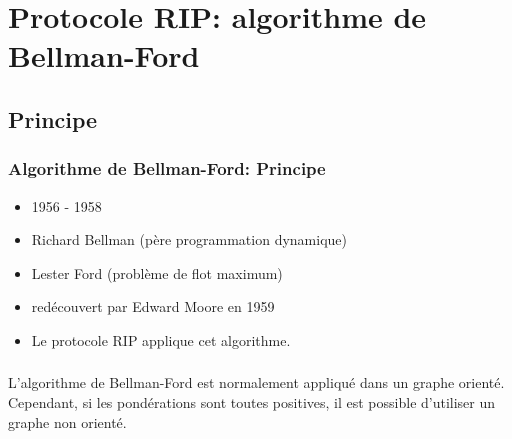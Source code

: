 \documentclass[svgnames,11pt]{beamer}
\begin{document}
\section{Protocole RIP: algorithme de Bellman-Ford}
\subsection{Principe}
\begin{frame}
    \frametitle{Algorithme de Bellman-Ford: Principe}

    \begin{itemize}
        \item<1-> 1956 - 1958
        \item<2-> Richard Bellman (père programmation dynamique)
        \item<3-> Lester Ford (problème de flot maximum)
        \item<4-> redécouvert par Edward Moore en 1959
        \item<5-> Le protocole RIP applique cet algorithme.
    \end{itemize}
\end{frame}
\begin{frame}
    \frametitle{}

    \begin{aretenir}[Remarque]
    L'algorithme de Bellman-Ford est normalement appliqué dans un graphe orienté. Cependant, si les pondérations sont toutes positives, il est possible d'utiliser un graphe non orienté.
    \end{aretenir}
    \begin{center}
        \label{pondere}
    \end{center}
\end{frame}
\end{document}
